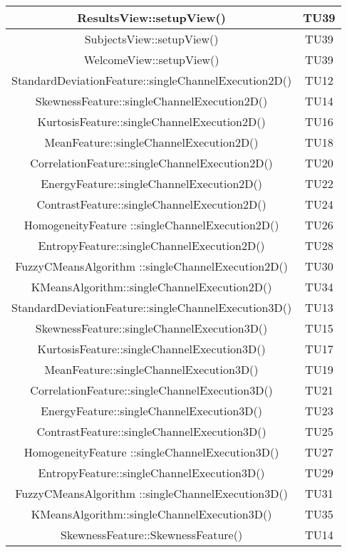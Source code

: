 \begin{center}
\begin{longtable}{|c|c|}
\hline 
ResultsView::setupView() & TU39 \\
\hline 
SubjectsView::setupView() & TU39 \\
\hline 
WelcomeView::setupView() & TU39 \\
\hline 
StandardDeviationFeature::singleChannelExecution2D() & TU12 \\
\hline 
SkewnessFeature::singleChannelExecution2D() & TU14 \\
\hline 
KurtosisFeature::singleChannelExecution2D() & TU16 \\
\hline 
MeanFeature::singleChannelExecution2D() & TU18 \\
\hline 
CorrelationFeature::singleChannelExecution2D() & TU20 \\
\hline 
EnergyFeature::singleChannelExecution2D() & TU22 \\
\hline 
ContrastFeature::singleChannelExecution2D() & TU24 \\
\hline 
HomogeneityFeature ::singleChannelExecution2D() & TU26 \\
\hline 
EntropyFeature::singleChannelExecution2D() & TU28 \\
\hline 
FuzzyCMeansAlgorithm ::singleChannelExecution2D() & TU30 \\
\hline 
KMeansAlgorithm::singleChannelExecution2D() & TU34 \\
\hline 
StandardDeviationFeature::singleChannelExecution3D() & TU13 \\
\hline 
SkewnessFeature::singleChannelExecution3D() & TU15 \\
\hline 
KurtosisFeature::singleChannelExecution3D() & TU17 \\
\hline 
MeanFeature::singleChannelExecution3D() & TU19 \\
\hline 
CorrelationFeature::singleChannelExecution3D() & TU21 \\
\hline 
EnergyFeature::singleChannelExecution3D() & TU23 \\
\hline 
ContrastFeature::singleChannelExecution3D() & TU25 \\
\hline 
HomogeneityFeature ::singleChannelExecution3D() & TU27 \\
\hline 
EntropyFeature::singleChannelExecution3D() & TU29 \\
\hline 
FuzzyCMeansAlgorithm ::singleChannelExecution3D() & TU31 \\
\hline  
KMeansAlgorithm::singleChannelExecution3D() & TU35 \\
\hline 
SkewnessFeature::SkewnessFeature() & TU14 \\

\end{longtable}
\end{center}
